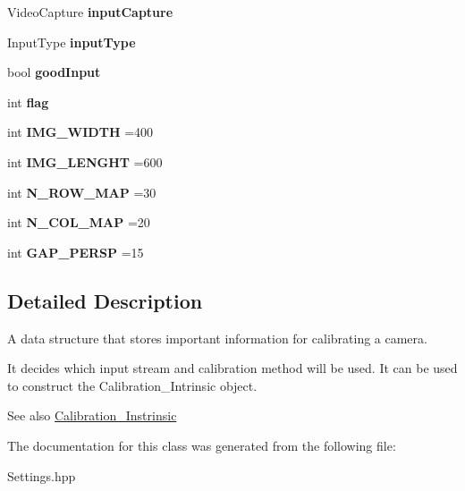 \begin{DoxyCompactItemize}
Video\+Capture {\bfseries input\+Capture}
\item 
\mbox{\label{class_settings_a89fb14ce9856fb642f18bb0f7c5b8868}} 
Input\+Type {\bfseries input\+Type}
\item 
\mbox{\label{class_settings_a3b9fc27b555f982bd5b9ea5198e1f7e3}} 
bool {\bfseries good\+Input}
\item 
\mbox{\label{class_settings_aba5691e3e76525f93ea254e654ec3717}} 
int {\bfseries flag}
\item 
\mbox{\label{class_settings_a5e8532b46bca347b6fc0336480914544}} 
int {\bfseries I\+M\+G\+\_\+\+W\+I\+D\+TH} =400
\item 
\mbox{\label{class_settings_ab0fe607b4c843f4fff0b1b651fd6bf02}} 
int {\bfseries I\+M\+G\+\_\+\+L\+E\+N\+G\+HT} =600
\item 
\mbox{\label{class_settings_a8cc44bebe159b733449a2b52f99cc264}} 
int {\bfseries N\+\_\+\+R\+O\+W\+\_\+\+M\+AP} =30
\item 
\mbox{\label{class_settings_a1768a2eeed3a80ccf1a9a645b8e9e946}} 
int {\bfseries N\+\_\+\+C\+O\+L\+\_\+\+M\+AP} =20
\item 
\mbox{\label{class_settings_a08b59baafe94e711e02075edc9febfa6}} 
int {\bfseries G\+A\+P\+\_\+\+P\+E\+R\+SP} =15
\end{DoxyCompactItemize}


\subsection{Detailed Description}
A data structure that stores important information for calibrating a camera. 

It decides which input stream and calibration method will be used. It can be used to construct the Calibration\+\_\+\+Intrinsic object. \begin{DoxySeeAlso}{See also}
\mbox{\hyperlink{class_calibration___instrinsic}{Calibration\+\_\+\+Instrinsic}} 
\end{DoxySeeAlso}


The documentation for this class was generated from the following file\+:\begin{DoxyCompactItemize}
\item 
Settings.\+hpp\end{DoxyCompactItemize}
